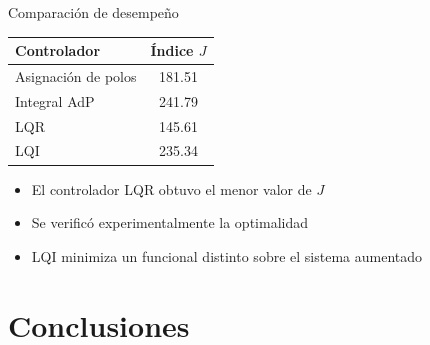 \documentclass[aspectratio=169]{beamer}
\begin{document}
\begin{frame}{Comparación de desempeño}

\begin{table}[H]
\centering
\begin{tabular}{lc}
\toprule
Controlador & Índice \(J\) \\
\midrule
Asignación de polos & 181.51 \\
Integral AdP & 241.79 \\
LQR & 145.61 \\
LQI & 235.34 \\
\bottomrule
\end{tabular}
\end{table}

\vspace{0.5cm}

\begin{itemize}
\item El controlador LQR obtuvo el menor valor de \(J\)
\item Se verificó experimentalmente la optimalidad
\item LQI minimiza un funcional distinto sobre el sistema aumentado
\end{itemize}

\end{frame}

\section{Conclusiones}
\end{document}
